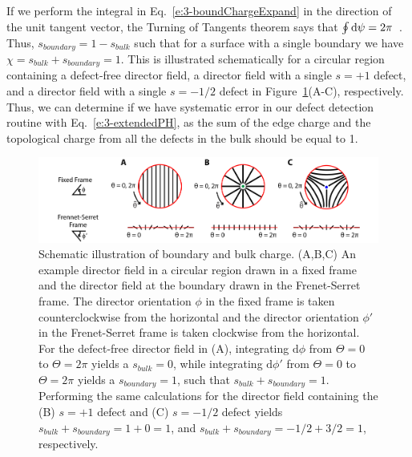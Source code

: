 If we perform the integral in Eq.~\ref{e:3-boundChargeExpand} in the direction of the unit tangent vector, the Turning of Tangents theorem says that $ \oint \textup{d}\psi = 2\pi$~\cite{RN35}.
Thus, $s_{boundary} = 1 - s_{bulk}$ such that for a surface with a single boundary we have $\chi = s_{bulk} + s_{boundary} = 1$.
This is illustrated schematically for a circular region containing a defect-free director field, a director field with a single $s = +1$ defect, and a director field with a single $s=-1/2$ defect in Figure~\ref{f:3-EdgeChargeEx}(A-C), respectively.
Thus, we can determine if we have systematic error in our defect detection routine with Eq.~\ref{e:3-extendedPH}, as the sum of the edge charge and the topological charge from all the defects in the bulk should be equal to 1.
\begin{figure}
  \centering
  \includegraphics{figures/C3/Ch3-Figs_EdgeChargeEx.png}
  \caption{Schematic illustration of boundary and bulk charge.
  (A,B,C) An example director field in a circular region drawn in a fixed frame and the director field at the boundary drawn in the Frenet-Serret frame.
  The director orientation $\phi$ in the fixed frame is taken counterclockwise from the horizontal and the director orientation $\phi'$ in the Frenet-Serret frame is taken clockwise from the horizontal.
  For the defect-free director field in (A), integrating $\textrm{d}\phi$ from $\Theta = 0$ to $\Theta = 2\pi$ yields a $s_{bulk} = 0$, while integrating $\textrm{d}\phi'$ from $\Theta = 0$ to $\Theta = 2\pi$ yields a $s_{boundary} = 1$, such that $s_{bulk} + s_{boundary}=1$.
  Performing the same calculations for the director field containing the (B) $s = +1$ defect and (C) $s = -1/2$ defect yields $s_{bulk} + s_{boundary}= 1 + 0= 1$, and $s_{bulk} + s_{boundary}= -1/2 + 3/2 = 1$, respectively.}\label{f:3-EdgeChargeEx}
\end{figure}

